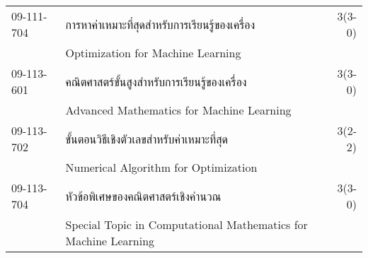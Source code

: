 \begin{longtable}{p{}p{}r{}}
09-111-704 & การหาค่าเหมาะที่สุดสำหรับการเรียนรู้ของเครื่อง & 3(3-0)\\
& Optimization for Machine Learning & \\[3mm]
09-113-601 & คณิตศาสตร์ขั้นสูงสำหรับการเรียนรู้ของเครื่อง & 3(3-0)\\
& Advanced Mathematics for Machine Learning & \\[3mm]
09-113-702 & ขั้นตอนวิธีเชิงตัวเลขสำหรับค่าเหมาะที่สุด  & 3(2-2)\\
& Numerical Algorithm for Optimization & \\[3mm]
09-113-704 & หัวข้อพิเศษของคณิตศาสตร์เชิงคำนวณ  & 3(3-0)\\
& Special Topic in Computational Mathematics for Machine Learning & \\[3mm]
\end{longtable}
